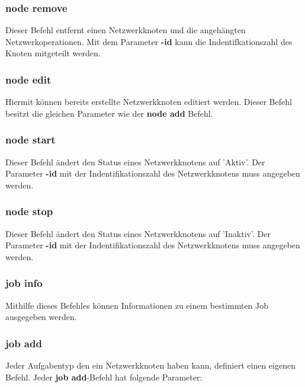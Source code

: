 \documentclass[12pt,a4paper]{report}
\begin{document}
\subsubsection{node remove}

Dieser Befehl entfernt einen Netzwerkknoten und die angehängten Netzwerkoperationen. Mit dem Parameter \textbf{-id} kann die Indentifkationszahl des Knoten mitgeteilt werden.

\subsubsection{node edit}

Hiermit können bereits erstellte Netzwerkknoten editiert werden. Dieser Befehl besitzt die gleichen Parameter wie der \textbf{node add} Befehl.

\subsubsection{node start}

Dieser Befehl ändert den Status eines Netzwerkknotens auf 'Aktiv'. Der Parameter \textbf{-id} mit der Indentifikationszahl des Netzwerkknotens muss angegeben werden.

\subsubsection{node stop}

Dieser Befehl ändert den Status eines Netzwerkknotens auf 'Inaktiv'. Der Parameter \textbf{-id} mit der Indentifikationszahl des Netzwerkknotens muss angegeben werden.

\subsubsection{job info}

Mithilfe dieses Befehles können Informationen zu einem bestimmten Job ausgegeben werden.

\subsubsection{job add}

Jeder Aufgabentyp den ein Netzwerkknoten haben kann, definiert einen eigenen Befehl. Jeder \textbf{job add}-Befehl hat folgende Parameter:
\end{document}
